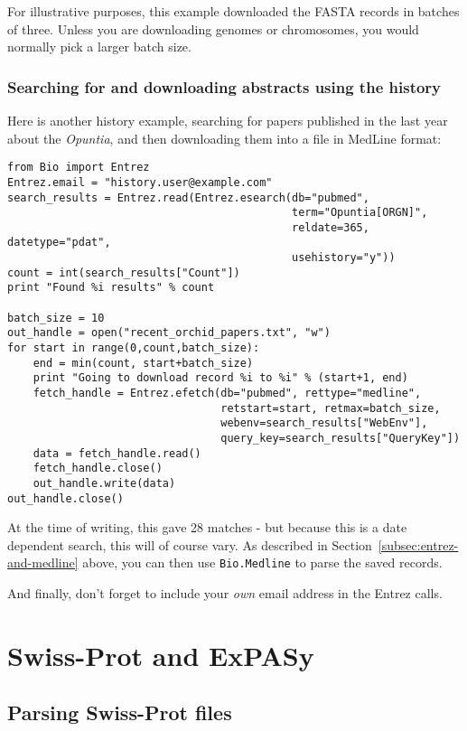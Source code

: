 \documentclass{report}
\begin{document}
\noindent For illustrative purposes, this example downloaded the FASTA records in batches of three.  Unless you are downloading genomes or chromosomes, you would normally pick a larger batch size.

\subsection{Searching for and downloading abstracts using the history}
Here is another history example, searching for papers published in the last year about the \textit{Opuntia}, and then downloading them into a file in MedLine format:

\begin{verbatim}
from Bio import Entrez
Entrez.email = "history.user@example.com"
search_results = Entrez.read(Entrez.esearch(db="pubmed",
                                            term="Opuntia[ORGN]",
                                            reldate=365, datetype="pdat",
                                            usehistory="y"))
count = int(search_results["Count"])
print "Found %i results" % count

batch_size = 10
out_handle = open("recent_orchid_papers.txt", "w")
for start in range(0,count,batch_size):
    end = min(count, start+batch_size)
    print "Going to download record %i to %i" % (start+1, end)
    fetch_handle = Entrez.efetch(db="pubmed", rettype="medline",
                                 retstart=start, retmax=batch_size,
                                 webenv=search_results["WebEnv"],
                                 query_key=search_results["QueryKey"])
    data = fetch_handle.read()
    fetch_handle.close()
    out_handle.write(data)
out_handle.close()
\end{verbatim}

\noindent At the time of writing, this gave 28 matches - but because this is a date dependent search, this will of course vary.  As described in Section~\ref{subsec:entrez-and-medline} above, you can then use \verb|Bio.Medline| to parse the saved records.

And finally, don't forget to include your \emph{own} email address in the Entrez calls.

\chapter{Swiss-Prot and ExPASy}
\label{chapter:swiss_prot}

\section{Parsing Swiss-Prot files}
\end{document}
